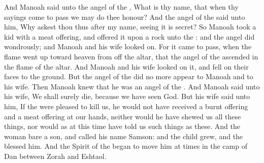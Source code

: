 \begin{biblechapter}
\verse And Manoah said unto the angel of the \LORD, What is thy name, that when thy sayings come to pass we may do thee honour?
\verse And the angel of the \LORD said unto him, Why askest thou thus after my name, seeing it is secret?
\verse So Manoah took a kid with a meat offering, and offered it upon a rock unto the \LORD: and the angel did wondrously; and Manoah and his wife looked on.
\verse For it came to pass, when the flame went up toward heaven from off the altar, that the angel of the \LORD ascended in the flame of the altar. And Manoah and his wife looked on it, and fell on their faces to the ground.
\verse But the angel of the \LORD did no more appear to Manoah and to his wife. Then Manoah knew that he was an angel of the \LORD.
\verse And Manoah said unto his wife, We shall surely die, because we have seen God.
\verse But his wife said unto him, If the \LORD were pleased to kill us, he would not have received a burnt offering and a meat offering at our hands, neither would he have shewed us all these things, nor would as at this time have told us such things as these.
\verse And the woman bare a son, and called his name Samson: and the child grew, and the \LORD blessed him.
\verse And the Spirit of the \LORD began to move him at times in the camp of Dan between Zorah and Eshtaol.
\end{biblechapter}

